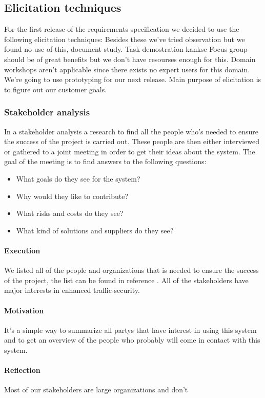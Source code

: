 \documentclass[10pt]{article}
\begin{document}
\subsection{Elicitation techniques}
For the first release of the requirements specification we decided to use the following elicitation techniques:
Besides these we’ve tried observation but we found no use of this, document study.
Task demostration kankse
Focus group should be of great benefits but we don’t have resourses enough for this.
Domain workshops aren’t applicable since there exists no expert users for this domain.
We’re going to use prototyping for our next release.
Main purpose of elicitation is to figure out our customer goals.

\subsubsection{Stakeholder analysis}
In a stakeholder analysis a research to find all the people who’s needed to ensure the success of the project is carried out. These people are then either interviewed or gathered to a joint meeting in order to get their ideas about the system. The goal of the meeting is to find answers to the following questions:
\begin{itemize}
\item What goals do they see for the system?
\item Why would they like to contribute?
\item What risks and costs do they see?
\item What kind of solutions and suppliers do they see?
\end{itemize}

\paragraph{Execution}
We listed all of the people and organizations that is needed to ensure the success of the project, the list can be found in reference \cite{pmv2}. All of the stakeholders have major interests in enhanced traffic-security.
\paragraph{Motivation}
It’s a simple way to summarize all partys that have interest in using this system and to get an overview of the people who probably will come in contact with this system.
\paragraph{Reflection}
Most of our stakeholders are large organizations and don’t
\end{document}
